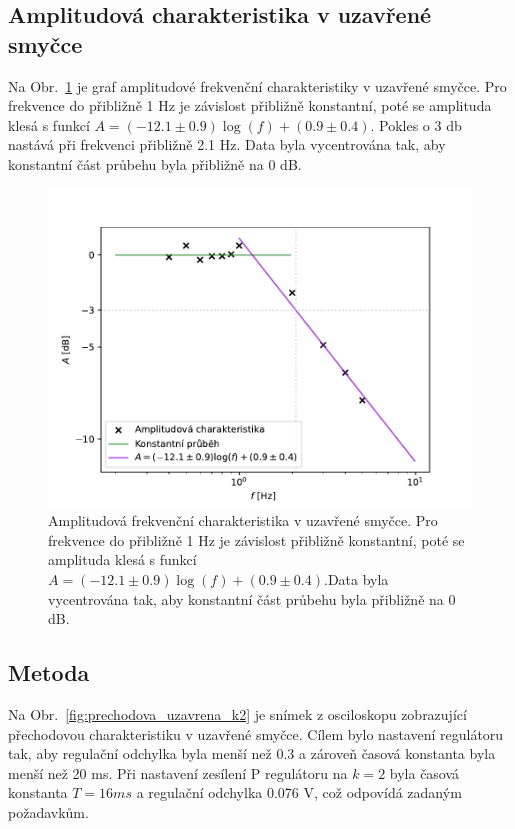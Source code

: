 	\subsection{Amplitudová charakteristika v uzavřené smyčce}
		Na Obr.~\ref{fig:amplitudova_uzavrena} je graf amplitudové frekvenční charakteristiky v uzavřené smyčce. Pro frekvence do přibližně 1 Hz je závislost přibližně konstantní, poté se amplituda klesá s funkcí $A=(-12.1\pm 0.9)\log(f)+(0.9\pm 0.4)$. Pokles o 3 db nastává při frekvenci přibližně 2.1 Hz. Data byla vycentrována tak, aby konstantní část průbehu byla přibližně na 0 dB.
		\begin{figure}[H] 
			\centering
			\includegraphics[scale = 0.7]{img/graf_amplitudova_uzavrena.pdf} 
			\caption{Amplitudová frekvenční charakteristika v uzavřené smyčce. Pro frekvence do přibližně 1 Hz je závislost přibližně konstantní, poté se amplituda klesá s funkcí $A=(-12.1\pm 0.9)\log(f)+(0.9\pm 0.4)$.Data byla vycentrována tak, aby konstantní část průbehu byla přibližně na 0 dB.} 
			\label{fig:amplitudova_uzavrena}
		\end{figure}

	\subsection{Metoda }
		Na Obr.~\ref{fig:prechodova_uzavrena_k2} je snímek z osciloskopu zobrazující přechodovou charakteristiku v uzavřené smyčce. Cílem bylo nastavení regulátoru tak, aby  regulační odchylka byla menší než 0.3 a zároveň časová konstanta byla menší než 20 ms. Při nastavení zesílení P regulátoru na $k=2$ byla časová konstanta $T=16\unit{ms}$ a regulační odchylka 0.076 V, což odpovídá zadaným požadavkům.
		
